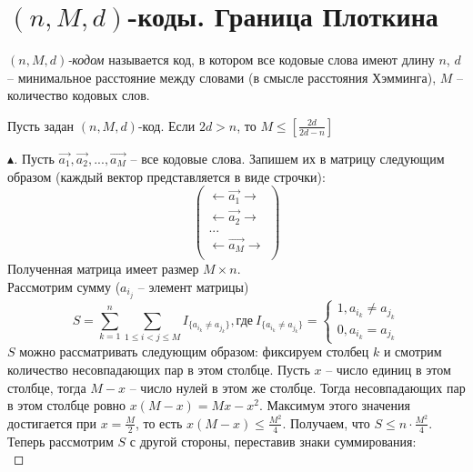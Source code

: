 \setcounter{section}{55}
\section{$(n, M, d)$-коды. Граница Плоткина}
\begin{definition}
    \textit{$(n, M, d)$-кодом} называется код, в котором все кодовые слова имеют длину $n$, $d$ -- минимальное расстояние между словами (в смысле расстояния Хэмминга), $M$ -- количество кодовых слов.
\end{definition}

\begin{theorem}
    Пусть задан $(n, M, d)$-код. Если $2d > n$, то $M \leq \left[ \frac{2d}{2d - n} \right]$
    \begin{proof}[$\blacktriangle$]
        Пусть $\Vec{a_1}, \Vec{a_2}, ..., \Vec{a_M}$ -- все кодовые слова. Запишем их в матрицу следующим образом (каждый вектор представляется в виде строчки):
        $$\begin{pmatrix}
            \leftarrow \Vec{a_1} \rightarrow \\
            \leftarrow \Vec{a_2} \rightarrow \\
            ...\\
            \leftarrow \Vec{a_M} \rightarrow \\
        \end{pmatrix}$$
        Полученная матрица имеет размер $M \times n$.\\
        Рассмотрим сумму ($a_{i_j}$ -- элемент матрицы)
        $$
        S = \sum \limits_{k=1}^{n} \sum \limits_{1 \leq i < j \leq M} I_{ \{ a_{i_{k}} \neq a_{j_{k}} \} }, \text{где}\ I_{ \{ a_{i_{k}} \neq a_{j_{k}} \} } = 
        \begin{cases}
            1, a_{i_{k}} \neq a_{j_{k}}\\
            0, a_{i_{k}} = a_{j_{k}}
        \end{cases}
        $$
        $S$ можно рассматривать следующим образом: фиксируем столбец $k$ и смотрим количество несовпадающих пар в этом столбце. Пусть $x$ -- число единиц в этом столбце, тогда $M - x$ -- число нулей в этом же столбце. Тогда несовпадающих пар в этом столбце ровно $x(M-x) = Mx - x^2$. Максимум этого значения достигается при $x = \frac{M}{2}$, то есть $x(M-x) \leq \frac{M^2}{4}$. Получаем, что $S \leq n \cdot \frac{M^2}{4}$.\\
        Теперь рассмотрим $S$ с другой стороны, переставив знаки суммирования:\\

\end{proof}
\end{theorem}
